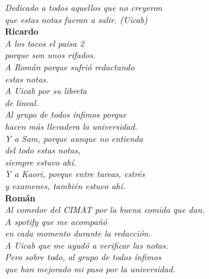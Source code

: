 \documentclass[12pt,a4paper]{book}
\begin{document}
        
    
    \thispagestyle{empty}
    

    \begin{flushright}
      \thispagestyle{empty}

        \textit{Dedicado a todos aquellos que no creyeron\\
        que estas notas fueran a salir. (Uicab)}\\[1cm]

        \textbf{Ricardo}\\[0.3cm]
        \textit{A los tacos el paisa 2\\
        porque son unos rifados.\\
        A Román porque sufrió redactando\\
        estas notas.\\
        A Uicab por su libreta\\
        de lineal.\\
        Al grupo de todos ínfimos porque\\
        hacen más llevadera la universidad.\\
        Y a Sam, porque aunque no entienda\\
        del todo estas notas,\\
        siempre estuvo ahí.\\
        Y a Kaori, porque entre tareas, estrés\\
        y examenes, también estuvo ahí.}\\[1.2cm]

        \textbf{Román}\\[0.3cm]
        \textit{Al comedor del CIMAT por la buena comida que dan.\\
        A spotify que me acompañó\\
        en cada momento durante la redacción.\\
        A Uicab que me ayudó a verificar las notas.\\
        Pero sobre todo, al grupo de todos ínfimos\\
        que han mejorado mi paso por la universidad.}
    \end{flushright}


    \cleardoublepage
    \thispagestyle{empty}
\end{document}
